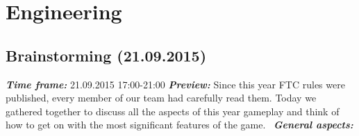 \section{Engineering}

\subsection{Brainstorming (21.09.2015)}
	\textit{\textbf{Time frame:}} 21.09.2015 17:00-21:00 \newline
	\textit{\textbf{Preview:}} Since this year FTC rules were published, every member of our team had carefully read them. Today we gathered together to discuss all the aspects of this year gameplay and think of how to get on with the most significant features of the game. \newline
	\textit{\textbf{General aspects:}}
